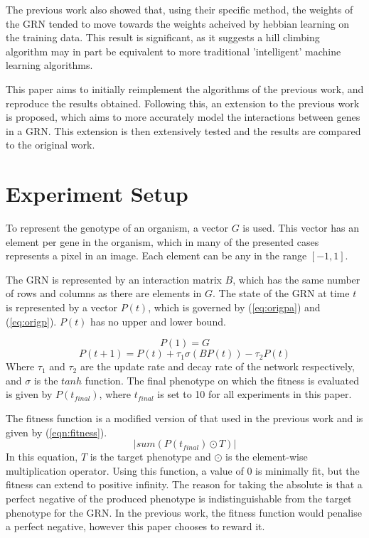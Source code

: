 \documentclass[twocolumn,a4paper]{article}
\begin{document}
    The previous work also showed that, using their specific method, the weights of the GRN tended to move towards the weights acheived by hebbian learning on the training data. This result is significant, as it suggests a hill climbing algorithm may in part be equivalent to more traditional 'intelligent' machine learning algorithms.

    This paper aims to initially reimplement the algorithms of the previous work, and reproduce the results obtained. Following this, an extension to the previous work is proposed, which aims to more accurately model the interactions between genes in a GRN. This extension is then extensively tested and the results are compared to the original work.

    \section{Experiment Setup}
    To represent the genotype of an organism, a vector $G$ is used. This vector has an element per gene in the organism, which in many of the presented cases represents a pixel in an image. Each element can be any in the range $[-1,1]$.

    The GRN is represented by an interaction matrix $B$, which has the same number of rows and columns as there are elements in $G$. The state of the GRN at time $t$ is represented by a vector $P(t)$, which is governed by (\ref{eq:origpa}) and (\ref{eq:origp}). $P(t)$ has no upper and lower bound.
    
    \begin{equation} \label{eq:origpa}
        P(1) = G
    \end{equation}
    \begin{equation} \label{eq:origp}
        P(t+1) = P(t) + \tau_1 \sigma (B P(t)) - \tau_2 P(t)
    \end{equation}
    Where $\tau_1$ and $\tau_2$ are the update rate and decay rate of the network respectively, and $\sigma$ is the $tanh$ function. The final phenotype on which the fitness is evaluated is given by $P(t_{final})$, where $t_{final}$ is set to 10 for all experiments in this paper.

    The fitness function is a modified version of that used in the previous work and is given by (\ref{eqn:fitness}).
    \begin{equation} \label{eqn:fitness}
        |{sum} (P(t_{final}) \odot T)|
    \end{equation}
    In this equation, $T$ is the target phenotype and $\odot$ is the element-wise multiplication operator. Using this function, a value of 0 is minimally fit, but the fitness can extend to positive infinity. The reason for taking the absolute is that a perfect negative of the produced phenotype is indistinguishable from the target phenotype for the GRN. In the previous work, the fitness function would penalise a perfect negative, however this paper chooses to reward it.
\end{document}
